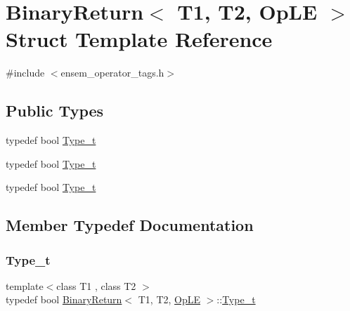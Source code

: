 \hypertarget{structBinaryReturn_3_01T1_00_01T2_00_01OpLE_01_4}{}\section{Binary\+Return$<$ T1, T2, Op\+LE $>$ Struct Template Reference}
\label{structBinaryReturn_3_01T1_00_01T2_00_01OpLE_01_4}


{\ttfamily \#include $<$ensem\+\_\+operator\+\_\+tags.\+h$>$}

\subsection*{Public Types}
\begin{DoxyCompactItemize}
\item 
typedef bool \mbox{\hyperlink{structBinaryReturn_3_01T1_00_01T2_00_01OpLE_01_4_a97477e4d06d79977296f86c374a5bc1e}{Type\+\_\+t}}
\item 
typedef bool \mbox{\hyperlink{structBinaryReturn_3_01T1_00_01T2_00_01OpLE_01_4_a97477e4d06d79977296f86c374a5bc1e}{Type\+\_\+t}}
\item 
typedef bool \mbox{\hyperlink{structBinaryReturn_3_01T1_00_01T2_00_01OpLE_01_4_a97477e4d06d79977296f86c374a5bc1e}{Type\+\_\+t}}
\end{DoxyCompactItemize}


\subsection{Member Typedef Documentation}
\mbox{\label{structBinaryReturn_3_01T1_00_01T2_00_01OpLE_01_4_a97477e4d06d79977296f86c374a5bc1e}} 
\subsubsection{\texorpdfstring{Type\_t}{Type\_t}\hspace{0.1cm}{\footnotesize\ttfamily [1/3]}}
{\footnotesize\ttfamily template$<$class T1 , class T2 $>$ \\
typedef bool \mbox{\hyperlink{structBinaryReturn}{Binary\+Return}}$<$ T1, T2, \mbox{\hyperlink{structOpLE}{Op\+LE}} $>$\+::\mbox{\hyperlink{structBinaryReturn_3_01T1_00_01T2_00_01OpLE_01_4_a97477e4d06d79977296f86c374a5bc1e}{Type\+\_\+t}}}

